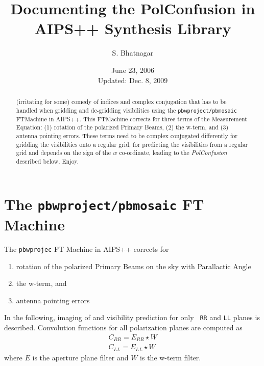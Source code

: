 \documentclass[11pt,epsf]{article}
\begin{document}
\title{Documenting the PolConfusion in AIPS++ Synthesis Library}
\author{S. Bhatnagar}
\date{June 23, 2006\\\small{Updated: Dec. 8, 2009}}
\maketitle

\normalsize

\begin{abstract}
  (irritating for some) comedy of indices and complex conjugation that
  has to be handled when gridding and de-gridding visibilities using
  the {\tt pbwproject/pbmosaic} FTMachine in AIPS++.  This FTMachine
  corrects for three terms of the Measurement Equation: (1) rotation
  of the polarized Primary Beams, (2) the w-term, and (3) antenna
  pointing errors.  These terms need to be complex conjugated
  differently for gridding the visibilities onto a regular grid, for
  predicting the visibilities from a regular grid and depends on the
  sign of the $w$ co-ordinate, leading to the {\it PolConfusion}
  described below.  Enjoy.
\end{abstract}

\section{The {\tt pbwproject/pbmosaic} FT Machine}

The {\tt pbwprojec} FT Machine in AIPS++ corrects for 
\begin{enumerate}
\item rotation of the polarized Primary Beams on the sky with
  Parallactic Angle
\item the w-term, and
\item antenna pointing errors
\end{enumerate}

In the following, imaging of and visibility prediction for only {\tt
  RR} and {\tt LL} planes is described.  Convolution functions for all
polarization planes are computed as
\begin{eqnarray}
C_{RR} = E_{RR} \star W \nonumber\\
C_{LL} = E_{LL} \star W
\end{eqnarray}
where $E$ is the aperture plane filter and $W$ is the w-term filter.
\end{document}
